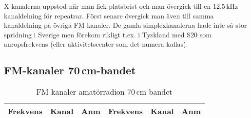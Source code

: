 X-kanalerna uppstod när man fick platsbrist och man övergick till en
12.5\,kHz kanaldelning för repeatrar. Först senare övergick man även
till samma kanaldelning på övriga FM-kanaler. De gamla
simplexkanalerna hade inte så stor spridning i Sverige men förekom
rikligt t.ex. i Tyskland med S20 som anropsfrekvens (eller
aktivitetscenter som det numera kallas).


\subsection{FM-kanaler 70\,cm-bandet}

\small

\begin{longtable}{rrl|rrl}
\caption{FM-kanaler amatörradion 70\,cm-bandet}\\
\textbf{Frekvens} & \textbf{Kanal} & \textbf{Anm} &
\textbf{Frekvens} & \textbf{Kanal} & \textbf{Anm} \\ \hline


\end{longtable}

